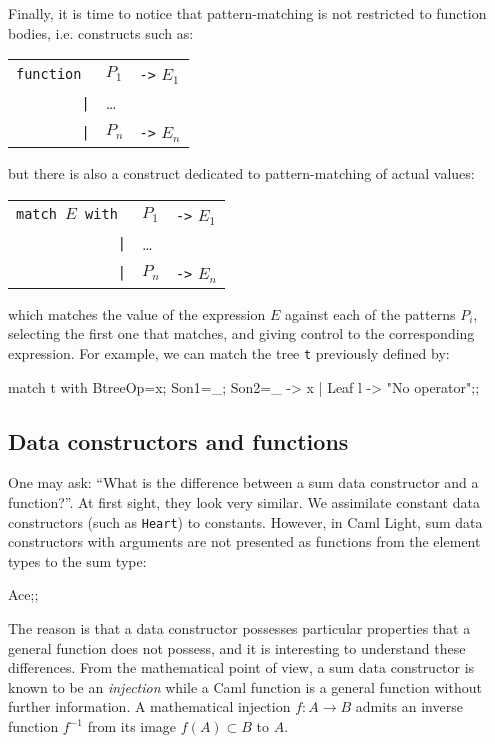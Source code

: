 Finally, it is time to notice that pattern-matching is not restricted to
function bodies, i.e. constructs such as:
\begin{center}
\begin{tabular}{rll}
\tt function & $P_1$ & \verb|->| $E_1$\\
    \verb'|' & \ldots\\
    \verb'|' & $P_n$ & \verb|->| $E_n$
\end{tabular}
\end{center}
but there is also a construct dedicated to pattern-matching of actual
values:
\begin{center}
\begin{tabular}{rll}
\tt match $E$ with & $P_1$ & \verb|->| $E_1$\\
          \verb'|' & \ldots\\
          \verb'|' & $P_n$ & \verb|->| $E_n$
\end{tabular}
\end{center}
which matches the value of the expression $E$ against each of the
patterns $P_i$, selecting the first one that matches, and giving
control to the corresponding expression. For example, we can match the
tree {\tt t} previously defined by:
\begin{caml_example}
match t with Btree{Op=x; Son1=_; Son2=_} -> x
           | Leaf l -> "No operator";;
\end{caml_example}

\subsection{Data constructors and functions}

One may ask: ``What is the difference between a sum data constructor and a
function?''.
At first sight, they look very similar. We assimilate constant data
constructors (such as {\tt Heart}) to constants. However, in Caml Light, sum data constructors with arguments are not presented as functions from the element types to the sum type:
\begin{caml_example}
Ace;;
\end{caml_example}
The reason is that a data constructor possesses particular properties
that a general function does not possess, and it is interesting to
understand these differences.  From the mathematical point of view, a
sum data constructor is known to be an {\em injection} while a Caml
function is a general function without further information.
A mathematical injection $f: A \rightarrow B$ admits an inverse function
$f^{-1}$ from its image $f(A) \subset B$ to $A$.

